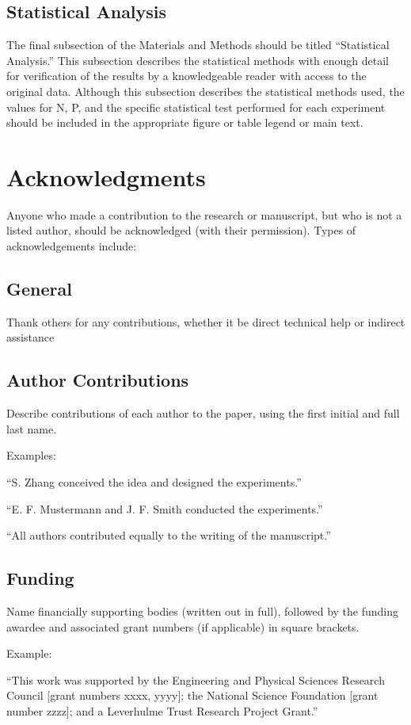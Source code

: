 \documentclass{article}
\begin{document}
\subsection{Statistical Analysis}
The final subsection of the Materials and Methods should be titled “Statistical Analysis.”  This subsection describes the statistical methods with enough detail for verification of the results by a knowledgeable reader with access to the original data. Although this subsection describes the statistical methods used, the values for N, P, and the specific statistical test performed for each experiment should be included in the appropriate figure or table legend or main text. 

\section*{Acknowledgments}
Anyone who made a contribution to the research or manuscript, but who is not a listed author, should be acknowledged (with their permission). Types of acknowledgements include:

\subsection*{General} 
Thank others for any contributions, whether it be direct technical help or indirect assistance 

\subsection*{Author Contributions} 
Describe contributions of each author to the paper, using the first initial and full last name. 

\medskip Examples:

``S. Zhang conceived the idea and designed the experiments.''

``E. F. Mustermann and J. F. Smith conducted the experiments.''

``All authors contributed equally to the writing of the manuscript.''

\subsection*{Funding}
Name financially supporting bodies (written out in full), followed by the funding awardee and associated grant numbers (if applicable) in square brackets. 

\medskip Example: 

``This work was supported by the Engineering and Physical Sciences Research Council [grant numbers xxxx, yyyy]; the National Science Foundation [grant number zzzz]; and a Leverhulme Trust Research Project Grant.'' 
\end{document}

